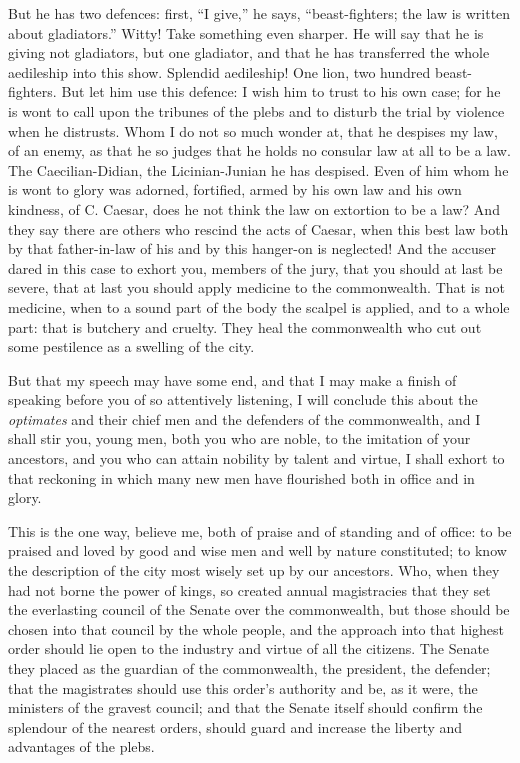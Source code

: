  But he has two defences: first, ``I give,'' he says, ``beast-fighters; the law is written about gladiators.'' Witty! Take something even sharper. He will say that he is giving not gladiators, but one gladiator, and that he has transferred the whole aedileship into this show. Splendid aedileship! One lion, two hundred beast-fighters. But let him use this defence: I wish him to trust to his own case; for he is wont to call upon the tribunes of the plebs and to disturb the trial by violence when he distrusts. Whom I do not so much wonder at, that he despises my law, of an enemy, as that he so judges that he holds no consular law at all to be a law. The Caecilian-Didian, the Licinian-Junian he has despised. Even of him whom he is wont to glory was adorned, fortified, armed by his own law and his own kindness, of C. Caesar, does he not think the law on extortion to be a law? And they say there are others who rescind the acts of Caesar, when this best law both by that father-in-law of his and by this hanger-on is neglected! And the accuser dared in this case to exhort you, members of the jury, that you should at last be severe, that at last you should apply medicine to the commonwealth. That is not medicine, when to a sound part of the body the scalpel is applied, and to a whole part: that is butchery and cruelty. They heal the commonwealth who cut out some pestilence as a swelling of the city.

 But that my speech may have some end, and that I may make a finish of speaking before you of so attentively listening, I will conclude this about the \textit{optimates} and their chief men and the defenders of the commonwealth, and I shall stir you, young men, both you who are noble, to the imitation of your ancestors, and you who can attain nobility by talent and virtue, I shall exhort to that reckoning in which many new men have flourished both in office and in glory.

 This is the one way, believe me, both of praise and of standing and of office: to be praised and loved by good and wise men and well by nature constituted; to know the description of the city most wisely set up by our ancestors. Who, when they had not borne the power of kings, so created annual magistracies that they set the everlasting council of the Senate over the commonwealth, but those should be chosen into that council by the whole people, and the approach into that highest order should lie open to the industry and virtue of all the citizens. The Senate they placed as the guardian of the commonwealth, the president, the defender; that the magistrates should use this order's authority and be, as it were, the ministers of the gravest council; and that the Senate itself should confirm the splendour of the nearest orders, should guard and increase the liberty and advantages of the plebs.

